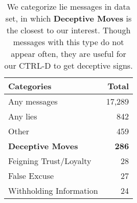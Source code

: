 \begin{table}[t]
\centering
\begin{tabular}{lr}
\hline
 Categories&Total\\ 
\hline
Any messages& 17,289\\
\hline
Any lies&842 \\
\hspace{3mm} Other &459\\
\rowcolor{lime} \hspace{3mm} \textbf{Deceptive Moves}&\textbf{286}\\
 \hspace{3mm} Feigning Trust/Loyalty&28 \\
 \hspace{3mm} False Excuse&27\\
 \hspace{3mm} Withholding Information&24\\
\hline
\end{tabular}
\caption{We categorize lie messages in \citet{peskov2020takes} data set, in which \textbf{Deceptive Moves} is the closest to our interest. Though messages with this type do not appear often, they are useful for our CTRL-D to get deceptive signs.}
\label{tab:denis_lies}
\end{table}
